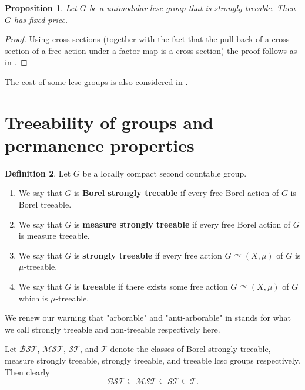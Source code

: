 \documentclass[11pt]{amsart}
\theoremstyle{definition}
\newtheorem{definition}{Definition}[section]
\theoremstyle{plain}
\newtheorem{proposition}[definition]{Proposition}
\newcommand{\<}{\langle}
\renewcommand{\>}{\rangle}
\newcommand{\BSTreeable}{\bm{\mathscr{BST}}}
\newcommand{\MSTreeable}{\bm{\mathscr{MST}}}
\newcommand{\STreeable}{\bm{\mathscr{ST}}}
\newcommand{\Treeable}{\bm{\mathscr{T}}}
\newcommand{\define}[1]{\textbf{#1}}
\newcommand{\pmp}{\text{p.m.p.}}
\begin{document}
\begin{appendices}
\begin{proposition}\label{prop:stronglytreeablefixedprice}
Let $G$ be a unimodular lcsc group that is strongly treeable. Then $G$ has fixed price.
\end{proposition}

\begin{proof}
Using cross sections (together with the fact that the pull back of a cross section of a free action under a factor map is a cross section) the proof follows as in \cite[Proposition VI.21]{Gab00a}.
\end{proof}


The cost of some lcsc groups is also considered in \cite{AM-21}.

\section{Treeability of groups and permanence properties}\label{sec:permanence}

\begin{definition}
\label{def:various treeab, groups}
Let $G$ be a locally compact second countable group.
\begin{enumerate}
\item We say that $G$ is \define{Borel strongly treeable} if every free Borel action of $G$ is Borel treeable.
\item We say that $G$ is \define{measure strongly treeable} if every free Borel action of $G$ is measure treeable.
\item We say that $G$ is \define{strongly treeable} if every free \pmp{} action $G\curvearrowright (X,\mu )$ of $G$ is $\mu$-treeable.
\item We say that $G$ is \define{treeable} if there exists some free \pmp{} action $G\curvearrowright (X,\mu )$ of $G$ which is $\mu$-treeable.
\end{enumerate}
\end{definition}
We renew our warning that "arborable" and "anti-arborable" in \cite{Gab00a} stands for what we call strongly treeable and non-treeable respectively here.

Let $\BSTreeable$, ${\MSTreeable}$, $\STreeable$, and $\Treeable$ denote the classes of Borel strongly treeable, measure strongly treeable, strongly treeable, and treeable lcsc groups respectively. Then clearly
\begin{equation*}\label{eqn:contain}
\BSTreeable\subseteq {\MSTreeable}\subseteq {\STreeable}\subseteq \Treeable .
\end{equation*}


\end{appendices}
\end{document}
